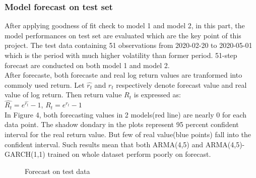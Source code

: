 \documentclass [letterpaper] {article}
\begin{document}
\subsubsection{Model forecast on test set}
After applying goodness of fit check to model 1 and model 2, in this part, the model performances on test set are evaluated which are the key point of this project. The test data containing 51 observations from 2020-02-20 to 2020-05-01 which is the period with much higher volatility than former period. 51-step forecast are conducted on both model 1 and model 2. \\
After forecaste, both forecaste and real log return values are tranformed into commoly used return. Let $\hat {r_t}$ and $r_t$ respectively denote forecast value and real value of log return. Then return value $R_t$ is expressed as:\\
$\hat {R_t}=e^{\hat{r_t}}-1$,  $R_t=e^{r_t}-1$\\
\indent In Figure 4, both forecasting values in 2 models(red line) are nearly 0 for each data point. The shadow dondary in the plots represent 95 percent confident interval for the real return value. But few of real value(blue points) fall into the confident interval. Such results mean that both ARMA(4,5) and ARMA(4,5)-GARCH(1,1) trained on whole dataset perform poorly on forecast. 

\begin{figure}[htp]
	\centering
	\quad
	\caption{Forecast on test data}
\end{figure}
\end{document}
